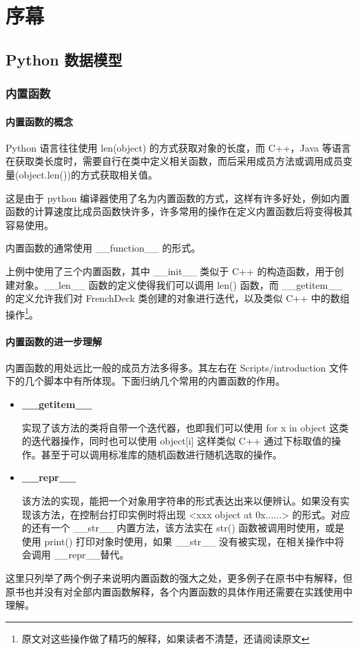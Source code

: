 \newpage

\chapter{序幕}
\section{Python 数据模型}
\subsection{内置函数}
\subsubsection{内置函数的概念}

Python 语言往往使用 len(object) 的方式获取对象的长度，而 C++，Java 等语言在获取类长度时，需要自行在类中定义相关函数，而后采用成员方法或调用成员变量(object.len())的方式获取相关值。

这是由于 python 编译器使用了名为内置函数的方式，这样有许多好处，例如内置函数的计算速度比成员函数快许多，许多常用的操作在定义内置函数后将变得极其容易使用。

内置函数的通常使用 \_\_function\_\_ 的形式。



上例中使用了三个内置函数，其中 \_\_init\_\_ 类似于 C++ 的构造函数，用于创建对象。\_\_len\_\_ 函数的定义使得我们可以调用 len() 函数，而 \_\_getitem\_\_ 的定义允许我们对 FrenchDeck 类创建的对象进行迭代，以及类似 C++ 中的数组操作\footnote{原文对这些操作做了精巧的解释，如果读者不清楚，还请阅读原文}。

\subsubsection{内置函数的进一步理解}

内置函数的用处远比一般的成员方法多得多。其左右在 Scripts/introduction 文件下的几个脚本中有所体现。下面归纳几个常用的内置函数的作用。

\begin{itemize}
    \item \textbf{\_\_getitem\_\_}
    
    实现了该方法的类将自带一个迭代器，也即我们可以使用 for x in object 这类的迭代器操作，同时也可以使用 object[i] 这样类似 C++ 通过下标取值的操作。甚至于可以调用标准库的随机函数进行随机选取的操作。

    \item \textbf{\_\_repr\_\_}
    
    该方法的实现，能把一个对象用字符串的形式表达出来以便辨认。如果没有实现该方法，在控制台打印实例时将出现 <xxx object at 0x......> 的形式。对应的还有一个 \_\_str\_\_ 内置方法，该方法实在 str() 函数被调用时使用，或是使用 print() 打印对象时使用，如果 \_\_str\_\_ 没有被实现，在相关操作中将会调用 \_\_repr\_\_替代。
\end{itemize}

这里只列举了两个例子来说明内置函数的强大之处，更多例子在原书中有解释，但原书也并没有对全部内置函数解释，各个内置函数的具体作用还需要在实践使用中理解。



\newpage